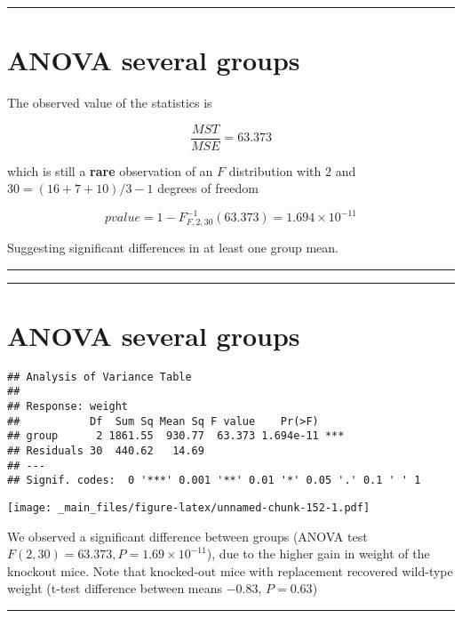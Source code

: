 \documentclass[
]{book}
\begin{document}
\begin{center}\rule{0.5\linewidth}{0.5pt}\end{center}

\hypertarget{anova-several-groups-3}{%
\section{ANOVA several groups}\label{anova-several-groups-3}}

The observed value of the statistics is

\[\frac{MST}{MSE}=63.373\]

which is still a \textbf{rare} observation of an \(F\) distribution with \(2\) and \(30=(16+7+10)/3-1\) degrees of freedom

\[pvalue=1-F^{-1}_{F,2,30}(63.373)=1.694 \times 10^{-11}\]

Suggesting significant differences in at least one group mean.

\begin{center}\rule{0.5\linewidth}{0.5pt}\end{center}

\begin{center}\rule{0.5\linewidth}{0.5pt}\end{center}

\hypertarget{anova-several-groups-4}{%
\section{ANOVA several groups}\label{anova-several-groups-4}}

\begin{verbatim}
## Analysis of Variance Table
## 
## Response: weight
##           Df  Sum Sq Mean Sq F value    Pr(>F)    
## group      2 1861.55  930.77  63.373 1.694e-11 ***
## Residuals 30  440.62   14.69                      
## ---
## Signif. codes:  0 '***' 0.001 '**' 0.01 '*' 0.05 '.' 0.1 ' ' 1
\end{verbatim}

\texttt{[image: \_main\_files/figure-latex/unnamed-chunk-152-1.pdf]}

We observed a significant difference between groups (ANOVA test \(F(2,30)=63.373, P= 1.69 \times 10^{-11}\)), due to the higher gain in weight of the knockout mice. Note that knocked-out mice with replacement recovered wild-type weight (t-test difference between means \(-0.83\), \(P=0.63\))

\begin{center}\rule{0.5\linewidth}{0.5pt}\end{center}
\end{document}
